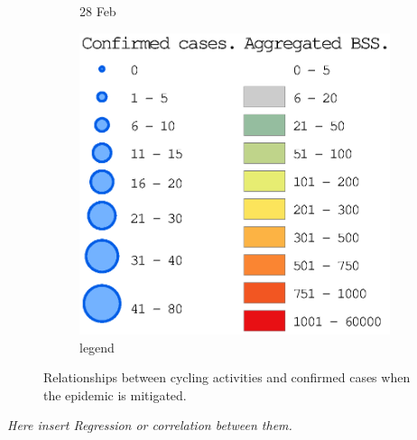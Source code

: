\documentclass[preprints,ijgi,submit,moreauthors]{Definitions/mdpi}
\begin{document}
\begin{figure}[H]
\begin{subfigure}{.3\textwidth}
        \caption{28 Feb}
    \end{subfigure}
    \begin{subfigure}{.3\textwidth}
        \includegraphics[width=\textwidth]{Figures/Figure7/Fig7legend.eps}
        \caption{legend}
    \end{subfigure}
    \caption{Relationships between cycling activities and confirmed cases when the epidemic is mitigated.}
    \label{fig:BSS_phase_3}
\end{figure}

\textit{Here insert Regression or correlation between them.}
\end{document}
